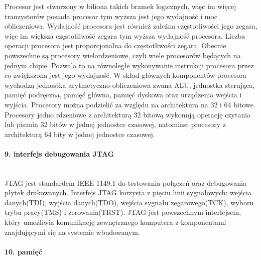 \documentclass[12p]{article}
\begin{document}
Procesor jest stworzony w biliona takich bramek logicznych, więc im więcej tranzystorów posiada procesor tym wyższa jest jego wydajność i moc obliczeniowa. Wydajność procesora jest również zależna częstotliwości jego zegara, więc im większa częstotliwość zegara tym wyższa wydajność procesora. Liczba operacji procesora jest proporcjonalna do częstotliwości zegara. Obecnie powszechne są procesory wielordzeniowe, czyli wiele procesorów będących na jednym chipie. Pozwala to na równoległe wykonywanie instrukcji procesora przez co zwiększona jest jego wydajność. W skład głównych komponentów procesora wychodzą jednostka arytmetyczno-obliczeniowa zwana ALU, jednostka sterująca, pamięć podręczna, pamięć główna, pamięć dyskowa oraz urządzenia wejścia i wyjścia. Procesory można podzielić za względu na architektura na 32 i 64 bitowe. Procesory jedno rdzeniowe z architekturą 32 bitową wykonują operację czytania lub pisania 32 bitów w jednej jednostce czasowej, natomiast procesory z architekturą 64 bity w jednej jednostce czasowej.  




\paragraph{9. interfejs debugowania JTAG} \mbox{} \\

JTAG jest standardem IEEE 1149.1 do testowania połączeń oraz debugowania płytek drukowanych. Interfejs JTAG korzysta z pięciu linii sygnałowych: wejścia danych(TDI), wyjścia danych(TDO), wejścia sygnału zegarowego(TCK), wyboru trybu pracy(TMS) i zerowania(TRST). JTAG jest powszechnym interfejsem, który umożliwia komunikację zewnętrznego komputera z komponentami znajdującymi się na systemie wbudowanym.

\paragraph{10. pamięć} \mbox{} \\
\end{document}
